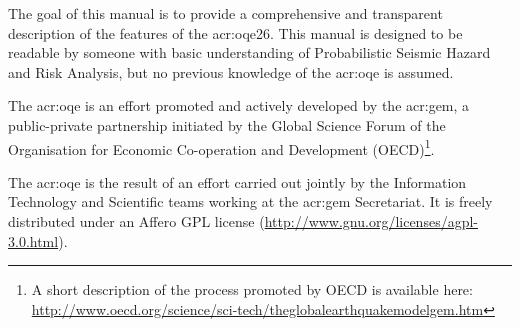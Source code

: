 The goal of this manual is to provide a comprehensive and transparent
description of the features of the \glsdesc{acr:oqe26}. This manual is
designed to be readable by someone with basic understanding of Probabilistic
Seismic Hazard and Risk Analysis, but no previous knowledge of the
\glsdesc{acr:oqe} is assumed.

The \glsdesc{acr:oqe} is an effort promoted and actively developed by the
\glsdesc{acr:gem}, a public-private partnership initiated by the
Global Science Forum of the Organisation for Economic Co-operation and Development
(OECD)\footnote{A short description of the process promoted by OECD is available here:\\\href{http://www.oecd.org/science/sci-tech/theglobalearthquakemodelgem.htm}{http://www.oecd.org/science/sci-tech/theglobalearthquakemodelgem.htm}}.

The \glsdesc{acr:oqe} is the result of an effort carried out jointly by the
Information Technology and Scientific teams working at the \gls{acr:gem} Secretariat.
It is freely distributed under an Affero GPL license
(\href{http://www.gnu.org/licenses/agpl-3.0.html}{http://www.gnu.org/licenses/agpl-3.0.html}).